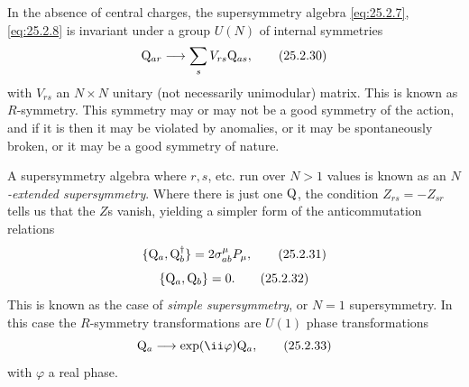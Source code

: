 In the absence of central charges, the supersymmetry algebra
\eqref{eq:25.2.7}, \eqref{eq:25.2.8} is invariant under a group \(U(N)\)
of internal symmetries
\begin{equation}
\mathrm{Q}_{ar}\longrightarrow\sum_sV_{rs}\mathrm{Q}_{as},
\tag{25.2.30}\label{eq:25.2.30}
\end{equation}
with \(V_{rs}\) an \(N\times N\) unitary (not necessarily unimodular)
matrix. This is known as \(R\)-symmetry. This symmetry may or may not be
a good symmetry of the action, and if it is then it may be violated by
anomalies, or it may be spontaneously broken, or it may be a good symmetry
of nature.

A supersymmetry algebra where \(r,s\), etc. run over \(N>1\) values is
known as an \emph{\(N\)-extended supersymmetry}. Where there is just one
\(\mathrm{Q}\), the condition \(Z_{rs}=-Z_{sr}\) tells us that the \(Z\)s
vanish, yielding a simpler form of the anticommutation relations
\begin{equation}
\{\mathrm{Q}_a,\mathrm{Q}_b^\dagger\}=2\sigma^\mu_{ab}P_\mu,
\tag{25.2.31}\label{eq:25.2.31}
\end{equation}
\begin{equation}
\{\mathrm{Q}_a,\mathrm{Q}_b\}=0.
\tag{25.2.32}\label{eq:25.2.32}
\end{equation}
This is known as the case of \emph{simple supersymmetry}, or \(N=1\)
supersymmetry. In this case the \(R\)-symmetry transformations are \(U(1)\)
phase transformations
\begin{equation}
\WeylQ_a\longrightarrow\exp(\ii\varphi)\WeylQ_a,
\tag{25.2.33}\label{eq:25.2.33}
\end{equation}
with \(\varphi\) a real phase.


